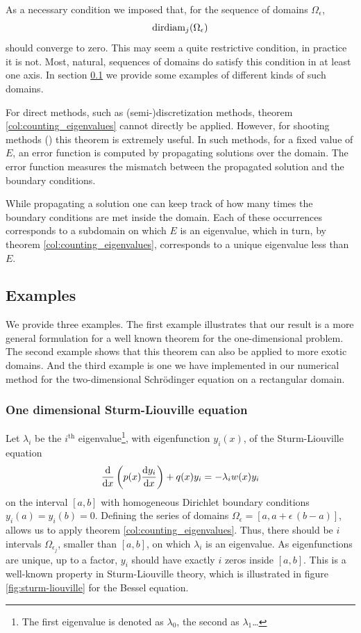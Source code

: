 As a necessary condition we imposed that, for the sequence of domains $\Omega_\epsilon$,
$$
  \operatorname{dirdiam}_j(\Omega_\epsilon)
$$
should converge to zero. This may seem a quite restrictive condition, in practice it is not. Most, natural, sequences of domains do satisfy this condition in at least one axis. In section \ref{sec:examples} we provide some examples of different kinds of such domains.

For direct methods, such as (semi-)discretization methods, theorem \ref{col:counting_eigenvalues} cannot directly be applied. However, for shooting methods (\cite{ixaru_new_2010,baeyens_improvements_2022}) this theorem is extremely useful.
In such methods, for a fixed value of $E$, an error function is computed by propagating solutions over the domain. The error function measures the mismatch between the propagated solution and the boundary conditions.

While propagating a solution one can keep track of how many times the boundary conditions are met inside the domain. Each of these occurrences corresponds to a subdomain on which $E$ is an eigenvalue, which in turn, by theorem \ref{col:counting_eigenvalues}, corresponds to a unique eigenvalue less than $E$.


\subsection{Examples}\label{sec:examples}

We provide three examples. The first example illustrates that our result is a more general formulation for a well known theorem for the one-dimensional problem. The second example shows that this theorem can also be applied to more exotic domains. And the third example is one we have implemented in our numerical method for the two-dimensional Schrödinger equation on a rectangular domain.

\subsubsection{One dimensional Sturm-Liouville equation}

Let $\lambda_i$ be the $i^{\text{th}}$ eigenvalue\footnote{The first eigenvalue is denoted as $\lambda_0$, the second as $\lambda_1$\dots}, with eigenfunction $y_i(x)$, of the Sturm-Liouville equation
$$
  \dv{x} \left( p(x) \dv{y_i}{x} \right) + q(x) y_i = -\lambda_i w(x) y_i
$$
on the interval $[a, b]$ with homogeneous Dirichlet boundary conditions $y_i(a) = y_i(b) = 0$. Defining the series of domains $\Omega_\epsilon = [a, a + \epsilon\,(b-a)]$, allows us to apply theorem \ref{col:counting_eigenvalues}. Thus, there should be $i$ intervals $\Omega_{\epsilon_j}$, smaller than $[a, b]$, on which $\lambda_i$ is an eigenvalue. As eigenfunctions are unique, up to a factor, $y_i$ should have exactly $i$ zeros inside $[a, b]$. This is a well-known property in Sturm-Liouville theory, which is illustrated in figure \ref{fig:sturm-liouville} for the Bessel equation.

